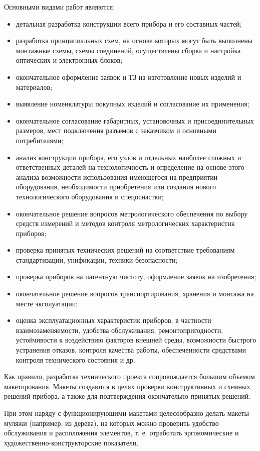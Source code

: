 Основными видами работ являются:
\begin{itemize}
	\item детальная разработка конструкции всего прибора и его составных частей;
	\item разработка принципиальных схем, на основе которых могут быть выполнены монтажные схемы, схемы соединений, осуществлены сборка и настройка оптических и электронных блоков;
	\item окончательное оформление заявок и ТЗ на изготовление новых изделий и материалов;
	\item выявление номенклатуры покупных изделий и согласование их применения;
	\item окончательное согласование габаритных, установочных и присоединительных размеров, мест подключения разъемов с заказчиком и основными потребителями;
	\item анализ конструкции прибора, его узлов и отдельных наиболее сложных и ответственных деталей на технологичность и определение на основе этого анализа возможности использования имеющегося на предприятии оборудования, необходимости приобретения или создания нового технологического оборудования и спецоснастки;
	\item окончательное решение вопросов метрологического обеспечения по выбору средств измерений и методов контроля метрологических характеристик приборов;
	\item проверка принятых технических решений на соответствие требованиям стандартизации, унификации, техники безопасности;
	\item проверка приборов на патентную чистоту, оформление заявок на изобретения;
	\item окончательное решение вопросов транспортирования, хранения и монтажа на месте эксплуатации;
	\item оценка эксплуатационных характеристик приборов, в частности взаимозаменяемости, удобства обслуживания, ремонтопригодности, устойчивости к воздействию факторов внешней среды, возможности быстрого устранения отказов, контроля качества работы, обеспеченности средствами контроля технического состояния и др.
\end{itemize}

Как правило, разработка технического проекта сопровождается большим объемом макетирования. Макеты создаются в целях проверки конструктивных и схемных решений прибора, а также для подтверждения окончательно принятых решений. 

При этом наряду с функционирующими макетами целесообразно делать макеты-муляжи (например, из дерева), на которых можно проверить удобство обслуживания и расположения элементов, т. е. отработать эргономические и художественно-конструкторские показатели.

